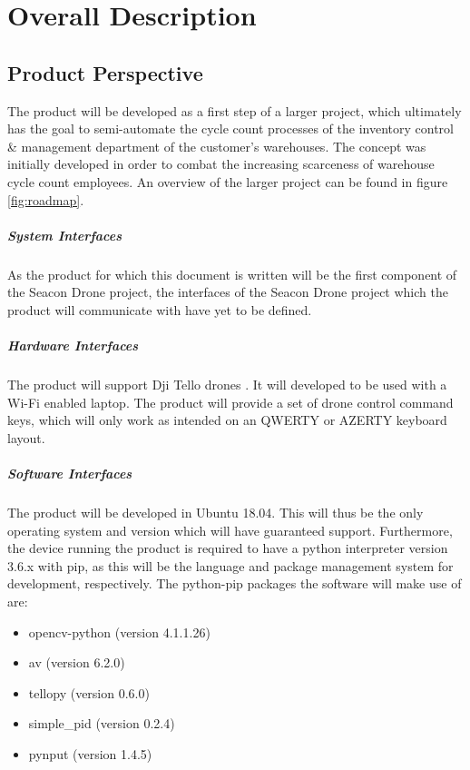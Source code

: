 \chapter{Overall Description}
\label{ch:overall_description}

\section{Product Perspective}
The product will be developed as a first step of a larger project, which ultimately has the goal to semi-automate the cycle count processes of the inventory control \& management department of the customer's warehouses. The concept was initially developed in order to combat the increasing scarceness of warehouse cycle count employees. An overview of the larger project can be found in figure \ref{fig:roadmap}.

\paragraph{System Interfaces}
As the product for which this document is written will be the first component of the Seacon Drone project, the interfaces of the Seacon Drone project which the product will communicate with have yet to be defined.

\paragraph{Hardware Interfaces}
The product will support Dji Tello drones \citep{tello}. It will developed to be used with a Wi-Fi enabled laptop. The product will provide a set of drone control command keys, which will only work as intended on an QWERTY or AZERTY keyboard layout.

\paragraph{Software Interfaces}
The product will be developed in Ubuntu 18.04. This will thus be the only operating system and version which will have guaranteed support. Furthermore, the device running the product is required to have a python interpreter version 3.6.x with pip, as this will be the language and package management system for development, respectively. The python-pip packages the software will make use of are:
\begin{itemize}
	\item opencv-python (version 4.1.1.26) \citep{opencv}
	\item av (version 6.2.0) \citep{av}
	\item tellopy (version 0.6.0) \citep{tellopy}
	\item simple\_pid (version 0.2.4) \citep{pid}
	\item pynput (version 1.4.5) \citep{pynput}
\end{itemize}

